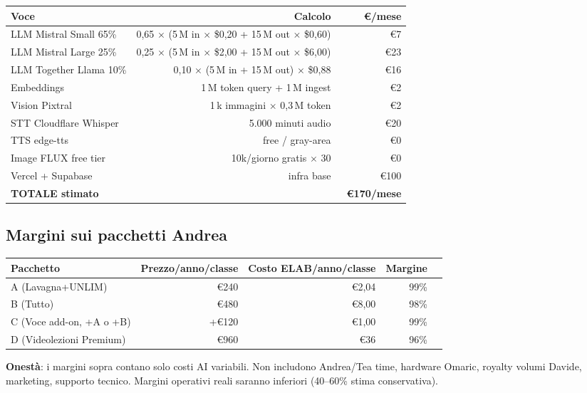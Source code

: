 \documentclass[12pt,a4paper]{article}
\begin{document}
\begin{center}
\begin{tabular}{l r r}
\toprule
\textbf{Voce} & \textbf{Calcolo} & \textbf{€/mese} \\
\midrule
LLM Mistral Small 65\%  & 0,65 $\times$ (5\,M in $\times$ \$0,20 + 15\,M out $\times$ \$0,60) & ~€7 \\
LLM Mistral Large 25\%  & 0,25 $\times$ (5\,M in $\times$ \$2,00 + 15\,M out $\times$ \$6,00) & ~€23 \\
LLM Together Llama 10\% & 0,10 $\times$ (5\,M in + 15\,M out) $\times$ \$0,88 & ~€16 \\
Embeddings              & 1\,M token query + 1\,M ingest & ~€2 \\
Vision Pixtral          & 1\,k immagini $\times$ 0,3\,M token & ~€2 \\
STT Cloudflare Whisper  & 5.000 minuti audio & ~€20 \\
TTS edge-tts            & free / gray-area & €0 \\
Image FLUX free tier    & 10k/giorno gratis $\times$ 30 & €0 \\
Vercel + Supabase       & infra base & ~€100 \\
\midrule
\textbf{TOTALE stimato} & & \textbf{~€170/mese} \\
\bottomrule
\end{tabular}
\end{center}

\subsection{Margini sui pacchetti Andrea}

\begin{center}
\begin{tabular}{l r r r r}
\toprule
\textbf{Pacchetto} & \textbf{Prezzo/anno/classe} & \textbf{Costo ELAB/anno/classe} & \textbf{Margine} \\
\midrule
A (Lavagna+UNLIM)            & €240   & ~€2,04 & 99\% \\
B (Tutto)                    & €480   & ~€8,00 & 98\% \\
C (Voce add-on, +A o +B)    & +€120  & ~€1,00 & 99\% \\
D (Videolezioni Premium)    & €960   & ~€36   & 96\% \\
\bottomrule
\end{tabular}
\end{center}

\textbf{Onestà}: i margini sopra contano solo costi AI variabili. Non includono Andrea/Tea time, hardware Omaric, royalty volumi Davide, marketing, supporto tecnico. Margini operativi reali saranno inferiori (40--60\% stima conservativa).
\end{document}
